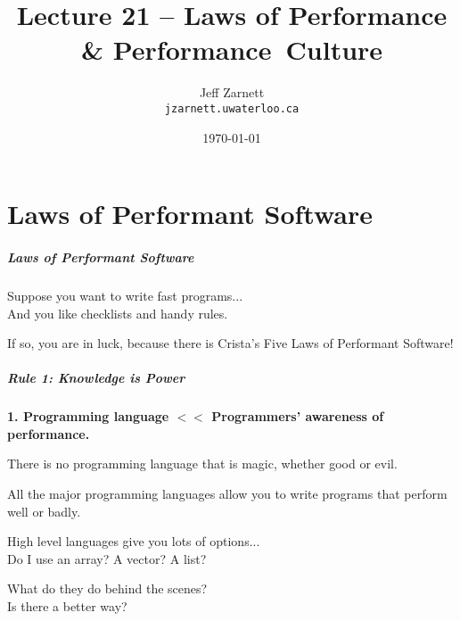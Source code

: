 

\title{Lecture 21 -- Laws of Performance \& Performance~Culture }

\author{Jeff Zarnett \\ \small \texttt{jzarnett.uwaterloo.ca}}
\date{\today}




\begin{frame}
  \titlepage

 \end{frame}


\part{Laws of Performant Software}

\begin{frame}
\partpage
\end{frame}


\begin{frame}
\frametitle{Laws of Performant Software}

Suppose you want to write fast programs...\\
\quad And you like checklists and handy rules. 

If so, you are in luck, because there is Crista's Five Laws of Performant Software!

\end{frame}



\begin{frame}
\frametitle{Rule 1: Knowledge is Power}

\textbf{1. Programming language $<<$ Programmers' awareness of performance.}

There is no programming language that is magic, whether good or evil. 

All the major programming languages allow you to write programs that perform well or badly. 

High level languages give you lots of options...\\
\quad Do I use an array? A vector? A list? 

What do they do behind the scenes?\\
\quad Is there a better way?

\end{frame}



